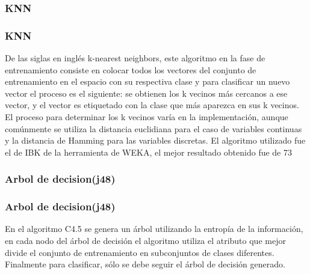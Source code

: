 \documentclass{beamer}
\begin{document}
\subsubsection{KNN}
\begin{frame}
\frametitle{KNN}
De las siglas en ingl\'{e}s k-nearest neighbors, este algoritmo en la fase de entrenamiento consiste en colocar todos los vectores del conjunto de entrenamiento en el espacio con su respectiva clase y para clasificar un nuevo vector el proceso es el siguiente: se obtienen los k vecinos m\'{a}s cercanos a ese vector, y el vector es etiquetado con la clase que m\'{a}s aparezca en sus k vecinos. El proceso para determinar los k vecinos var\'{i}a en la implementaci\'{o}n, aunque comúnmente se utiliza la distancia euclidiana para el caso de variables continuas y la distancia de Hamming para las variables discretas. El algoritmo utilizado fue el de IBK de la herramienta de WEKA, el mejor resultado obtenido fue de 73%
\end{frame}
\subsubsection{Arbol de decision(j48)}
\begin{frame}
\frametitle{Arbol de decision(j48)}
En el algoritmo C4.5 se genera un \'{a}rbol utilizando la entrop\'{i}a de la informaci\'{o}n, en cada nodo del \'{a}rbol de decisi\'{o}n el algoritmo utiliza el atributo que mejor divide el conjunto de entrenamiento en subconjuntos de clases diferentes. Finalmente para clasificar, s\'{o}lo se debe seguir el \'{a}rbol de decisi\'{o}n generado.
\end{frame}
\end{document}
